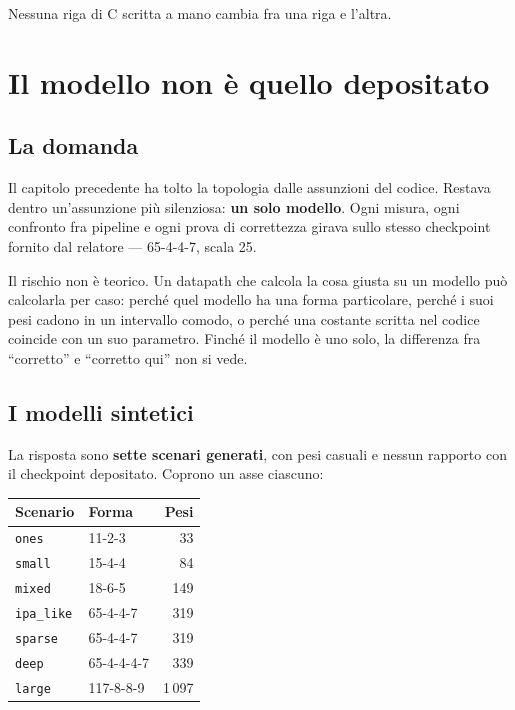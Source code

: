 \documentclass[11pt,a4paper,oneside]{report}
\begin{document}
Nessuna riga di C scritta a mano cambia fra una riga e l'altra.

\chapter{Il modello non è quello depositato}

\section{La domanda}

Il capitolo precedente ha tolto la topologia dalle assunzioni del codice.
Restava dentro un'assunzione più silenziosa: \textbf{un solo modello}. Ogni
misura, ogni confronto fra pipeline e ogni prova di correttezza girava sullo
stesso checkpoint fornito dal relatore --- 65-4-4-7, scala 25.

Il rischio non è teorico. Un datapath che calcola la cosa giusta su un modello
può calcolarla per caso: perché quel modello ha una forma particolare, perché i
suoi pesi cadono in un intervallo comodo, o perché una costante scritta nel
codice coincide con un suo parametro. Finché il modello è uno solo, la
differenza fra ``corretto'' e ``corretto qui'' non si vede.

\section{I modelli sintetici}

La risposta sono \textbf{sette scenari generati}, con pesi casuali e nessun
rapporto con il checkpoint depositato. Coprono un asse ciascuno:

\begin{center}
\small
\begin{tabular}{@{}llr@{}}
\toprule
\textbf{Scenario} & \textbf{Forma} & \textbf{Pesi} \\
\midrule
\texttt{ones}     & 11-2-3       &    33 \\
\texttt{small}    & 15-4-4       &    84 \\
\texttt{mixed}    & 18-6-5       &   149 \\
\texttt{ipa\_like}& 65-4-4-7     &   319 \\
\texttt{sparse}   & 65-4-4-7     &   319 \\
\texttt{deep}     & 65-4-4-4-7   &   339 \\
\texttt{large}    & 117-8-8-9    & 1\,097 \\
\bottomrule
\end{tabular}
\end{center}
\end{document}
